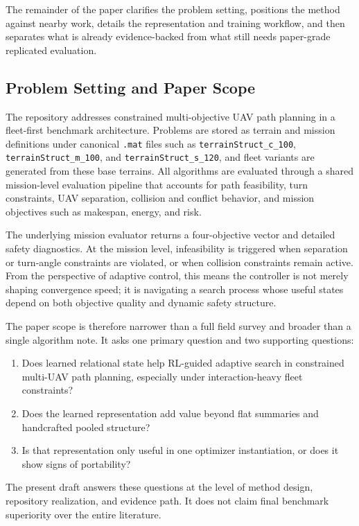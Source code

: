 \documentclass[a4paper,fleqn]{cas-dc}
\begin{document}
The remainder of the paper clarifies the problem setting, positions the method against nearby work, details the representation and training workflow, and then separates what is already evidence-backed from what still needs paper-grade replicated evaluation.

\subsection{Problem Setting and Paper Scope}

The repository addresses constrained multi-objective UAV path planning in a fleet-first benchmark architecture. Problems are stored as terrain and mission definitions under canonical \texttt{.mat} files such as \texttt{terrainStruct\_c\_100}, \texttt{terrainStruct\_m\_100}, and \texttt{terrainStruct\_s\_120}, and fleet variants are generated from these base terrains. All algorithms are evaluated through a shared mission-level evaluation pipeline that accounts for path feasibility, turn constraints, UAV separation, collision and conflict behavior, and mission objectives such as makespan, energy, and risk.

The underlying mission evaluator returns a four-objective vector and detailed safety diagnostics. At the mission level, infeasibility is triggered when separation or turn-angle constraints are violated, or when collision constraints remain active. From the perspective of adaptive control, this means the controller is not merely shaping convergence speed; it is navigating a search process whose useful states depend on both objective quality and dynamic safety structure.

The paper scope is therefore narrower than a full field survey and broader than a single algorithm note. It asks one primary question and two supporting questions:
\begin{enumerate}
\item Does learned relational state help RL-guided adaptive search in constrained multi-UAV path planning, especially under interaction-heavy fleet constraints?
\item Does the learned representation add value beyond flat summaries and handcrafted pooled structure?
\item Is that representation only useful in one optimizer instantiation, or does it show signs of portability?
\end{enumerate}

The present draft answers these questions at the level of method design, repository realization, and evidence path. It does not claim final benchmark superiority over the entire literature.
\end{document}
